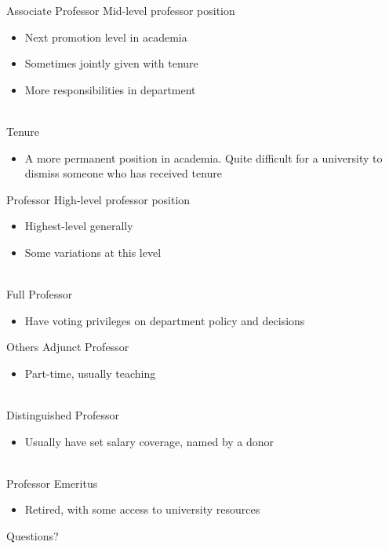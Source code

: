\documentclass[aspectratio=169]{beamer}
\begin{document}
\begin{frame}{Associate Professor}
	Mid-level professor position
	\begin{itemize}
		\item Next promotion level in academia
		\item Sometimes jointly given with tenure
		\item More responsibilities in department
	\end{itemize}
	~\\
	Tenure
	\begin{itemize}
		\item A more permanent position in academia. Quite difficult for a university to dismiss someone who has received tenure
	\end{itemize}
\end{frame}

\begin{frame}{Professor}
	High-level professor position
	\begin{itemize}
		\item Highest-level generally
		\item Some variations at this level
	\end{itemize}
	~\\
	Full Professor
	\begin{itemize}
		\item Have voting privileges on department policy and decisions
	\end{itemize}
\end{frame}

\begin{frame}{Others}
	Adjunct Professor
	\begin{itemize}
		\item Part-time, usually teaching
	\end{itemize}
	~\\
	Distinguished Professor
	\begin{itemize}
		\item Usually have set salary coverage, named by a donor
	\end{itemize}
	~\\
	Professor Emeritus
	\begin{itemize}
		\item Retired, with some access to university resources
	\end{itemize}	
\end{frame}

\begin{frame}{Questions?}
	~
\end{frame}
\end{document}
